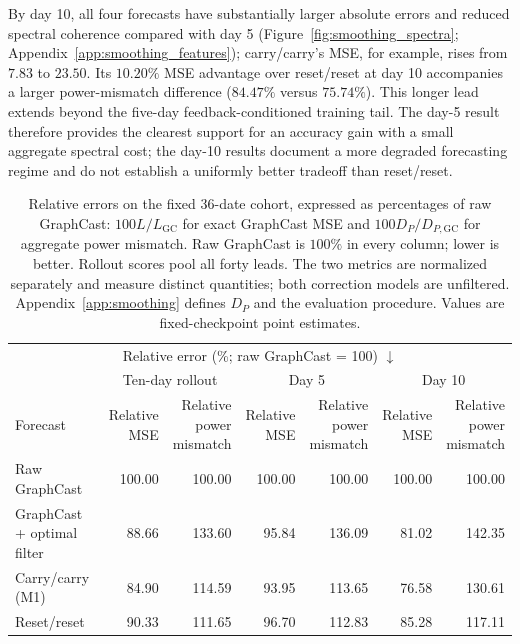 \documentclass{article}
\newcommand{\vfourred}[1]{{\color{red}#1}}
\begin{document}
\vfourred{By day 10, all four forecasts have substantially larger absolute errors and reduced spectral coherence compared with day 5 (Figure~\ref{fig:smoothing_spectra}; Appendix~\ref{app:smoothing_features}); carry/carry's MSE, for example, rises from $7.83$ to $23.50$. Its $10.20\%$ MSE advantage over reset/reset at day 10 accompanies a larger power-mismatch difference ($84.47\%$ versus $75.74\%$). This longer lead extends beyond the five-day feedback-conditioned training tail. The day-5 result therefore provides the clearest support for an accuracy gain with a small aggregate spectral cost; the day-10 results document a more degraded forecasting regime and do not establish a uniformly better tradeoff than reset/reset.}

\begin{table}[!htbp]
    \centering
    \begingroup\color{red}\small
    \setlength{\tabcolsep}{4pt}
    \begin{tabular}{lrrrrrr}
        \toprule
        \multicolumn{7}{c}{Relative error (\%; raw GraphCast = 100) $\downarrow$} \\
        \addlinespace[2pt]
        & \multicolumn{2}{c}{Ten-day rollout} & \multicolumn{2}{c}{Day 5} & \multicolumn{2}{c}{Day 10} \\
        \cmidrule(lr){2-3}\cmidrule(lr){4-5}\cmidrule(lr){6-7}
        Forecast & \shortstack{Relative\\MSE} & \shortstack{Relative\\power\\mismatch} & \shortstack{Relative\\MSE} & \shortstack{Relative\\power\\mismatch} & \shortstack{Relative\\MSE} & \shortstack{Relative\\power\\mismatch} \\
        \midrule
        Raw GraphCast & 100.00 & 100.00 & 100.00 & 100.00 & 100.00 & 100.00 \\
        GraphCast + optimal filter & 88.66 & 133.60 & 95.84 & 136.09 & 81.02 & 142.35 \\
        Carry/carry (M1) & 84.90 & 114.59 & 93.95 & 113.65 & 76.58 & 130.61 \\
        Reset/reset & 90.33 & 111.65 & 96.70 & 112.83 & 85.28 & 117.11 \\
        \bottomrule
    \end{tabular}
    \endgroup
    \caption{\vfourred{Relative errors on the fixed 36-date cohort, expressed as percentages of raw GraphCast: $100L/L_{\mathrm{GC}}$ for exact GraphCast MSE and $100D_P/D_{P,\mathrm{GC}}$ for aggregate power mismatch. Raw GraphCast is $100\%$ in every column; lower is better. Rollout scores pool all forty leads. The two metrics are normalized separately and measure distinct quantities; both correction models are unfiltered. Appendix~\ref{app:smoothing} defines $D_P$ and the evaluation procedure. Values are fixed-checkpoint point estimates.}}
    \label{tab:smoothing_scores}
\end{table}
\end{document}

